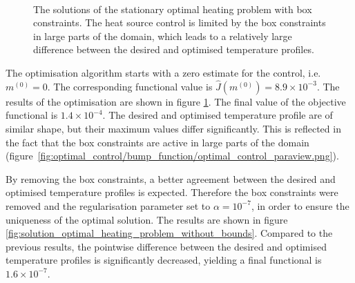 \documentclass[prodmode,acmtoms]{acmsmall}
\begin{document}
\begin{figure}[t]
\centering
        \\
        \caption{The solutions of the stationary optimal heating problem with box constraints. 
                 The heat source control is limited by the box constraints in large parts of the domain,
                  which leads to a relatively large difference between the desired and optimised temperature profiles.}\label{fig:solution_optimal_heating_problem}
\end{figure}

The optimisation algorithm starts with a zero estimate for the control, i.e. $m^{(0)} = 0$.
The corresponding functional value is $\hat J\left(m^{(0)}\right) = 8.9 \times 10^{-3}$. 
The results of the optimisation are shown in figure \ref{fig:solution_optimal_heating_problem}. 
The final value of the objective functional is $1.4 \times 10^{-4}$. 
The desired and optimised temperature profile are of similar shape, but their maximum values differ significantly. 
This is reflected in the fact that the box constraints are active in large parts of the domain (figure~\ref{fig:optimal_control/bump_function/optimal_control_paraview.png}).

By removing the box constraints, a better agreement between the desired and optimised temperature profiles is expected.
Therefore the box constraints were removed and the regularisation parameter set to $\alpha = 10^{-7}$, in order to ensure the uniqueness of the optimal solution.
The results are shown in figure \ref{fig:solution_optimal_heating_problem_without_bounds}. 
Compared to the previous results, the pointwise difference between the desired and optimised temperature profiles is significantly decreased,
yielding a final functional is $1.6 \times 10^{-7}$.
\end{document}
